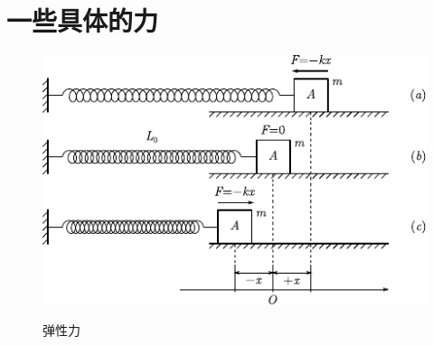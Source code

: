 \section{一些具体的力}\label{sec:03.04}

\begin{figure}
    \centering
    \includegraphics{figure/fig03.03}
    \label{fig:03.03}
    \caption{弹性力}
\end{figure}